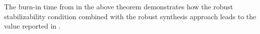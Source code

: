 The burn-in time from in the above theorem demonstrates how the robust stabilizability condition combined with the robust synthesis approach leads to the value reported in . 


